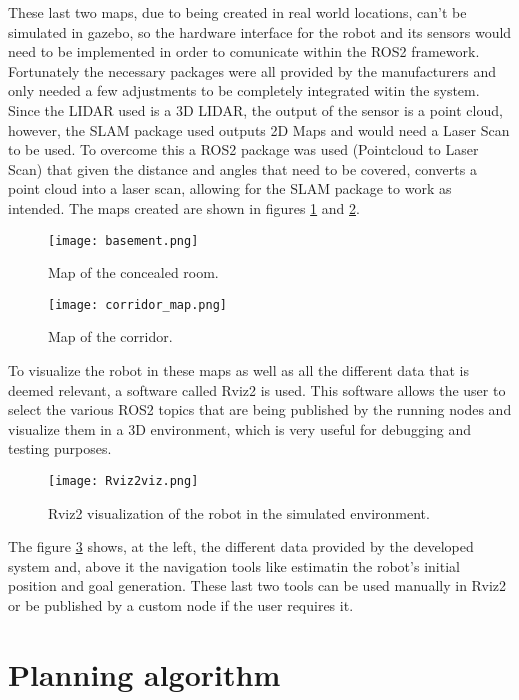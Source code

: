 These last two maps, due to being created in real world locations, can't be 
simulated in gazebo, so the hardware interface for the robot and its sensors 
would need to be implemented in order to comunicate within the \gls{ROS2} framework. 
Fortunately the necessary packages were all provided by the manufacturers \cite{ScoutRepo, RoboSense} and only needed a few adjustments to 
be completely integrated witin the system. Since the LIDAR used is a 3D LIDAR, the output 
of the sensor is a point cloud, however, the \gls{SLAM} package used outputs 2D Maps and would need a 
Laser Scan to be used. To overcome this a \gls{ROS2} package was used (Pointcloud to Laser Scan) that 
given the distance and angles that need to be covered, converts a point cloud into a laser scan, 
allowing for the \gls{SLAM} package to work as intended. The maps created are shown in figures \ref{fig:basement_map} and \ref{fig:corridor_map}.
\begin{figure}[H]
    \centering
    \texttt{[image: basement.png]}
    \caption{Map of the concealed room.}
    \label{fig:basement_map}
\end{figure}
\begin{figure}[H]
    \centering
    \texttt{[image: corridor\_map.png]}
    \caption{Map of the corridor.}
    \label{fig:corridor_map}
\end{figure}

To visualize the robot in these maps as well as all the different data that is deemed relevant, a software called 
Rviz2 is used. This software allows the user to select the various \gls{ROS2} topics that are being published 
by the running nodes and visualize them in a 3D environment, which is very useful for debugging and testing purposes.
\begin{figure}[H]
    \centering
    \texttt{[image: Rviz2viz.png]}
    \caption{Rviz2 visualization of the robot in the simulated environment.}
    \label{fig:rviz2_visualization}
\end{figure}

The figure \ref{fig:rviz2_visualization} shows, at the left, the different data provided by the developed system and, above it the 
navigation tools like estimatin the robot's initial position and goal generation. These last two tools can be used manually 
in Rviz2 or be published by a custom node if the user requires it.

\section{Planning algorithm}
\label{sec:planning_algorithm}

